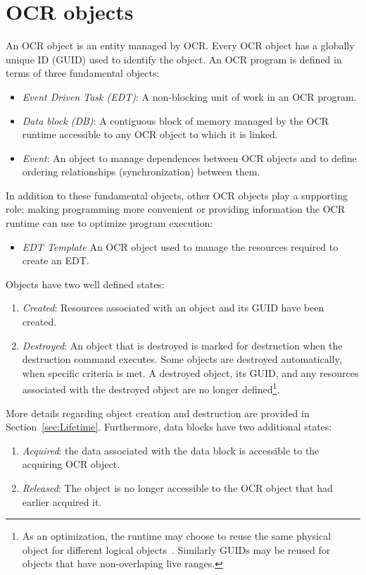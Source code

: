 %
\section{OCR objects}
\label{sec:OCRobjects}
An OCR object is an entity managed by OCR. Every OCR
object has a globally unique ID (GUID) used to identify the
object. An OCR program is defined in terms of three fundamental objects:
\begin{itemize}
  \item \emph{Event Driven Task (EDT)}: A non-blocking unit of work in an OCR
program.
  \item\emph{Data block (DB)}: A contiguous block of memory managed by the
OCR runtime accessible to any OCR object to which it is linked.
  \item\emph{Event}: An object to manage dependences between OCR objects and
to define ordering relationships (synchronization) between them.
\end{itemize}

In addition to these fundamental objects, other OCR objects
play a supporting role; making programming more convenient or
providing information the OCR runtime can use to optimize program execution:
\begin{itemize}
  \item \emph{EDT Template} An OCR object used to manage the resources
required to create an EDT.
\end{itemize}

Objects have two well defined states:
\begin{enumerate}
  \item \emph{Created}: Resources associated with an object and its GUID
have been created.
  \item \emph{Destroyed}: An object that is destroyed is marked for
destruction when the destruction command executes. Some objects
are destroyed automatically, when specific criteria is met. A destroyed object, its GUID,
and any resources associated with the destroyed object are no longer
defined\footnote{As
an optimization, the runtime may choose to reuse the same physical
object for different logical objects~\cite{USBCSS12,SbKS12}. Similarly
GUIDs may be reused for objects that have non-overlaping live ranges.}.
\end{enumerate}
More details regarding object creation and destruction are provided
in Section~\ref{sec:Lifetime}.
Furthermore, data blocks have two additional states:
\begin{enumerate}
  \item \emph{Acquired}: the data associated with the data block is
accessible to the acquiring OCR object.
  \item \emph{Released}: The object is no longer accessible to the OCR
object that had earlier acquired it.
\end{enumerate}
